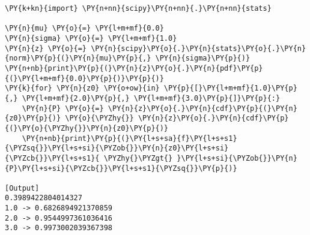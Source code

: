 \begin{Verbatim}[label=\makebox{\href{https://bitbucket.org/lbaldini/statnotes/src/master/snippets/scipy.stats.norm.py}{https://bitbucket.org/.../scipy.stats.norm.py}},commandchars=\\\{\}]
\PY{k+kn}{import} \PY{n+nn}{scipy}\PY{n+nn}{.}\PY{n+nn}{stats}

\PY{n}{mu} \PY{o}{=} \PY{l+m+mf}{0.0}
\PY{n}{sigma} \PY{o}{=} \PY{l+m+mf}{1.0}
\PY{n}{z} \PY{o}{=} \PY{n}{scipy}\PY{o}{.}\PY{n}{stats}\PY{o}{.}\PY{n}{norm}\PY{p}{(}\PY{n}{mu}\PY{p}{,} \PY{n}{sigma}\PY{p}{)}
\PY{n+nb}{print}\PY{p}{(}\PY{n}{z}\PY{o}{.}\PY{n}{pdf}\PY{p}{(}\PY{l+m+mf}{0.0}\PY{p}{)}\PY{p}{)}
\PY{k}{for} \PY{n}{z0} \PY{o+ow}{in} \PY{p}{[}\PY{l+m+mf}{1.0}\PY{p}{,} \PY{l+m+mf}{2.0}\PY{p}{,} \PY{l+m+mf}{3.0}\PY{p}{]}\PY{p}{:}
    \PY{n}{P} \PY{o}{=} \PY{n}{z}\PY{o}{.}\PY{n}{cdf}\PY{p}{(}\PY{n}{z0}\PY{p}{)} \PY{o}{\PYZhy{}} \PY{n}{z}\PY{o}{.}\PY{n}{cdf}\PY{p}{(}\PY{o}{\PYZhy{}}\PY{n}{z0}\PY{p}{)}
    \PY{n+nb}{print}\PY{p}{(}\PY{l+s+sa}{f}\PY{l+s+s1}{\PYZsq{}}\PY{l+s+si}{\PYZob{}}\PY{n}{z0}\PY{l+s+si}{\PYZcb{}}\PY{l+s+s1}{ \PYZhy{}\PYZgt{} }\PY{l+s+si}{\PYZob{}}\PY{n}{P}\PY{l+s+si}{\PYZcb{}}\PY{l+s+s1}{\PYZsq{}}\PY{p}{)}

[Output]
0.3989422804014327
1.0 -> 0.6826894921370859
2.0 -> 0.9544997361036416
3.0 -> 0.9973002039367398
\end{Verbatim}